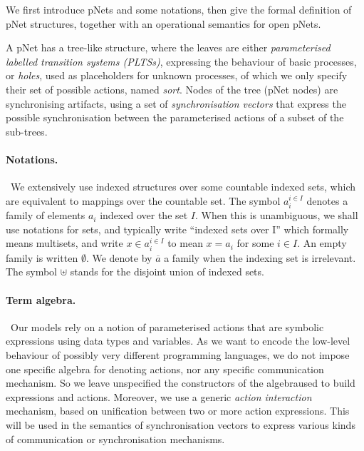 \documentclass[smallcondensed]{svjour3}
\begin{document}
We first introduce pNets and some notations, then give the formal definition of pNet structures, together with an operational semantics for open pNets.

A pNet has a tree-like structure, where the leaves are either
\emph{parameterised labelled transition systems (PLTSs)}, expressing the
behaviour of basic processes, or \emph{holes}, used as placeholders
for unknown processes, of which we only specify their set of possible
actions, named \emph{sort}.
Nodes of the tree (pNet nodes) are synchronising artifacts, using a
set of \emph{synchronisation vectors} that express the possible
synchronisation between the parameterised actions of a subset of the
sub-trees.


\paragraph*{Notations.} \
We extensively use indexed structures
over some countable indexed sets, which are equivalent to mappings over
the countable set. %
The symbol $a_i^{i\in I}$
denotes a family of elements $a_i$ indexed over the
set $I$.
When this is unambiguous, we shall use notations for sets, and typically write
``indexed sets over I'' which formally means multisets, and
write $x\in a_i^{i\in I}$ to mean $x=a_i$ for some $i\in I$.  An empty
family is written $\emptyset$. We
denote by $\overline{a}$ a family when the indexing set is
irrelevant. The symbol $\uplus$ stands for the disjoint union of indexed sets.

\paragraph*{Term algebra.} \
Our models rely on a notion of parameterised actions that are
symbolic expressions using data types and variables. As we want to encode
the low-level behaviour of possibly very different
programming languages, we do not impose one specific algebra
for denoting actions, nor any specific communication mechanism. So we
leave unspecified the constructors of the algebraused to build
expressions and actions. Moreover, we use a generic {\em action interaction}
mechanism, based on unification between two or more action
expressions. This will be used in the semantics of synchronisation
vectors to express various kinds of communication or synchronisation mechanisms.
\end{document}
